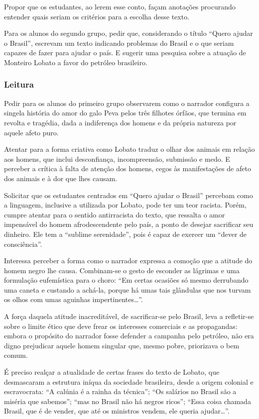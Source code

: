 \documentclass[12pt]{extarticle}
\begin{document}
Propor que os estudantes, ao lerem esse conto, façam anotações
procurando entender quais seriam os critérios para a escolha desse
texto.

Para os alunos do segundo grupo, pedir que, considerando o título
``Quero ajudar o Brasil'', escrevam um texto indicando problemas do
Brasil e o que seriam capazes de fazer para ajudar o país. E sugerir uma
pesquisa sobre a atuação de Monteiro Lobato a favor do petróleo
brasileiro.


\subsubsection{Leitura}

Pedir para os alunos do primeiro grupo observarem como o narrador
configura a singela história do amor do galo Peva pelos três filhotes
órfãos, que termina em revolta e tragédia, dada a indiferença dos homens
e da própria natureza por aquele afeto puro.

Atentar para a forma criativa como Lobato traduz o olhar dos animais em
relação aos homens, que inclui desconfiança, incompreensão, submissão e
medo. E perceber a crítica à falta de atenção dos homens, cegos às
manifestações de afeto dos animais e à dor que lhes causam.

Solicitar que os estudantes centrados em ``Quero ajudar o Brasil''
percebam como a linguagem, inclusive a utilizada por Lobato, pode ter um
teor racista. Porém, cumpre atentar para o sentido antirracista do
texto, que ressalta o amor impensável do homem afrodescendente pelo
país, a ponto de desejar sacrificar seu dinheiro. Ele tem a ``sublime
serenidade'', pois é capaz de exercer um ``dever de consciência''.

Interessa perceber a forma como o narrador expressa a comoção que a
atitude do homem negro lhe causa. Combinam-se o gesto de esconder as
lágrimas e uma formulação eufemística para o choro: ``Em certas ocasiões
só mesmo derrubando uma caneta e custando a achá-la, porque há umas tais
glândulas que nos turvam os olhos com umas aguinhas
impertinentes\ldots{}''.

A força daquela atitude inacreditável, de sacrificar-se pelo Brasil,
leva a refletir-se sobre o limite ético que deve frear os interesses
comerciais e as propagandas: embora o propósito do narrador fosse
defender a campanha pelo petróleo, não era digno prejudicar aquele homem
singular que, mesmo pobre, priorizava o bem comum.

É preciso realçar a atualidade de certas frases do texto de Lobato, que
desmascaram a estrutura iníqua da sociedade brasileira, desde a origem
colonial e escravocrata: ``A calúnia é a rainha da técnica''; ``Os
salários no Brasil são a miséria que sabemos''; ``mas no Brasil não há
negros ricos''; ``Essa coisa chamada Brasil, que é de vender, que até os
ministros vendem, ele queria ajudar\ldots{}''.
\end{document}
